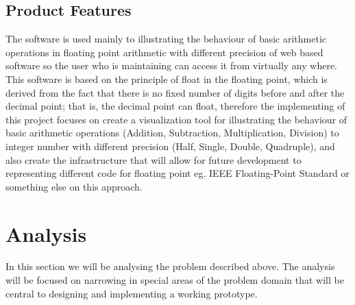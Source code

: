 \documentclass[11pt]{article}
\begin{document}
\subsection{Product Features}%
The software is used mainly to illustrating the behaviour of basic arithmetic operations in floating point arithmetic with different precision of web based software so the user who is maintaining can access it from virtually any where.\\

This software is based on the principle of float in the floating point, which is derived from the fact that there is no fixed number of digits before and after the decimal point; that is, the decimal point can float, therefore the implementing of this project focuses on create a visualization tool for illustrating the behaviour of basic arithmetic operations (Addition, Subtraction, Multiplication, Division) to integer number with different precision (Half, Single, Double, Quadruple), and also create the infrastructure that will allow for future development to representing different code for floating point eg. IEEE Floating-Point Standard or something else on this approach.

\section{Analysis}
In this section we will be analysing the problem described above. The analysis will be focused on narrowing in special areas of the problem domain that will be central to designing and implementing a working prototype.
\end{document}
